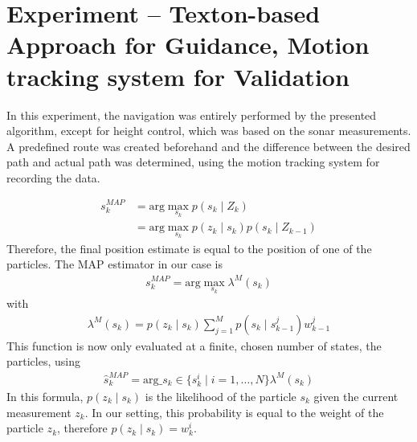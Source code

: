 
\section{Experiment -- Texton-based Approach for Guidance, Motion tracking system for Validation}
\label{sec:experiment-6}

In this experiment, the navigation was entirely performed by the
presented algorithm, except for height control, which was based on the
sonar measurements. A predefined route was created beforehand and the
difference between the desired path and actual path was determined,
using the motion tracking system for recording the data.


\begin{align}
  s_k^{MAP}  &= \text{arg}\max_{s_k}{p(s_k \mid Z_k)}\\
             &= \text{arg}\max_{s_k}{p(z_k \mid s_k) p(s_k \mid Z_{k-1})} 
\end{align}
Therefore, the final position estimate is equal to the position of one
of the particles. The MAP estimator in our case is
\begin{align}
s_k^{MAP} = \text{arg}\max_{s_k} \lambda^M(s_k)
\end{align}
with
\begin{align}
\lambda^M(s_k) = p(z_k \mid s_k) \sum_{j=1}^Mp(s_k \mid s_{k-1}^j)w^j_{k-1}
\end{align}
This function is now only evaluated at a finite, chosen number of
states, the particles, using
\begin{align}
\hat{s}_k^{MAP} = \text{arg}\_{s_k \in \{s_k^i \mid i=1,\ldots,N\}} \lambda^M(s_k)
\end{align}
In this formula, $p(z_k \mid s_k)$ is the likelihood of the particle
$s_k$ given the current measurement $z_k$. In our setting, this
probability is equal to the weight of the particle $z_k$, therefore
$p(z_k \mid s_k) = w^i_k$.